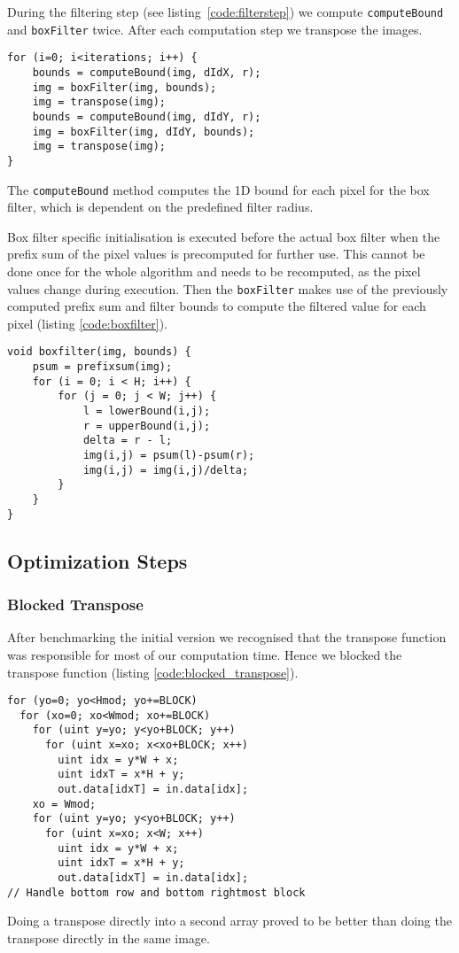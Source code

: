 During the filtering step (see listing~\ref{code:filterstep}) we compute \lstinline{computeBound} and \lstinline{boxFilter} twice. After each computation step we transpose the images.

\begin{lstlisting}[caption=Filterstep,label=code:filterstep]
for (i=0; i<iterations; i++) {
    bounds = computeBound(img, dIdX, r);
    img = boxFilter(img, bounds);
    img = transpose(img);
    bounds = computeBound(img, dIdY, r);
    img = boxFilter(img, dIdY, bounds);
    img = transpose(img);
}
\end{lstlisting}

The \lstinline{computeBound} method computes the 1D bound for each pixel for the box filter, which is dependent on the predefined filter radius. 

Box filter specific initialisation is executed before the actual box filter when the prefix sum of the pixel values is precomputed for further use. This cannot be done once for the whole algorithm and needs to be recomputed, as the pixel values change during execution. Then the \lstinline{boxFilter} makes use of the previously computed prefix sum and filter bounds to compute the filtered value for each pixel (listing \ref{code:boxfilter}).

\begin{lstlisting}[caption=Boxfilter step, label=code:boxfilter]
void boxfilter(img, bounds) {
    psum = prefixsum(img);
    for (i = 0; i < H; i++) {
        for (j = 0; j < W; j++) {
            l = lowerBound(i,j);
            r = upperBound(i,j);
            delta = r - l;
            img(i,j) = psum(l)-psum(r);
            img(i,j) = img(i,j)/delta;
        }
    }
}
\end{lstlisting}

\subsection{Optimization Steps}

\subsubsection{Blocked Transpose}

After benchmarking the initial version we recognised that the transpose function was responsible for most of our computation time. Hence we blocked the transpose function (listing \ref{code:blocked_transpose}).

\begin{lstlisting}[caption=Transpose block, label=code:blocked_transpose]
for (yo=0; yo<Hmod; yo+=BLOCK)
  for (xo=0; xo<Wmod; xo+=BLOCK)
    for (uint y=yo; y<yo+BLOCK; y++)
      for (uint x=xo; x<xo+BLOCK; x++)
        uint idx = y*W + x;
        uint idxT = x*H + y;
        out.data[idxT] = in.data[idx];
    xo = Wmod;
    for (uint y=yo; y<yo+BLOCK; y++)
      for (uint x=xo; x<W; x++)
        uint idx = y*W + x;
        uint idxT = x*H + y;
        out.data[idxT] = in.data[idx];
// Handle bottom row and bottom rightmost block
\end{lstlisting}
Doing a transpose directly into a second array proved to be better than doing the transpose directly in the same image.

